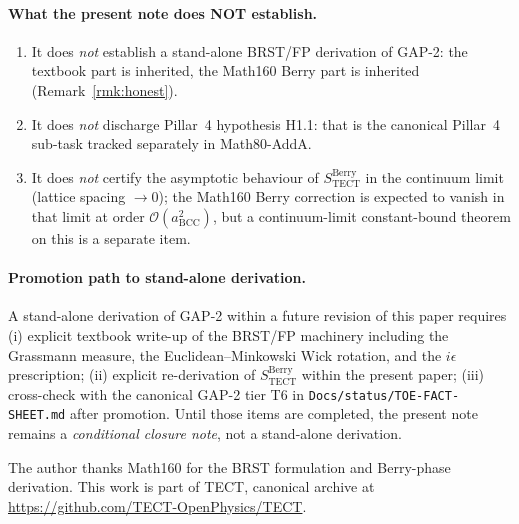 \paragraph{What the present note does NOT establish.}
\begin{enumerate}
  \item It does \emph{not} establish a stand-alone BRST/FP derivation
    of GAP-2: the textbook part is inherited, the Math160 Berry part
    is inherited (Remark~\ref{rmk:honest}).
  \item It does \emph{not} discharge Pillar~4 hypothesis H1.1: that
    is the canonical Pillar~4 sub-task tracked separately in
    Math80-AddA.
  \item It does \emph{not} certify the asymptotic behaviour of
    $S^{\mathrm{Berry}}_{\mathrm{TECT}}$ in the continuum limit
    (lattice spacing $\to 0$); the Math160 Berry correction is
    expected to vanish in that limit at order
    $\mathcal{O}(a_{\mathrm{BCC}}^2)$, but a continuum-limit
    constant-bound theorem on this is a separate item.
\end{enumerate}

\paragraph{Promotion path to stand-alone derivation.}
A stand-alone derivation of GAP-2 within a future revision of this
paper requires (i) explicit textbook write-up of the BRST/FP machinery
including the Grassmann measure, the Euclidean--Minkowski Wick
rotation, and the $i\epsilon$ prescription; (ii) explicit
re-derivation of $S^{\mathrm{Berry}}_{\mathrm{TECT}}$ within the
present paper; (iii) cross-check with the canonical GAP-2 tier T6 in
\texttt{Docs/status/TOE-FACT-SHEET.md} after promotion. Until those
items are completed, the present note remains a \emph{conditional
closure note}, not a stand-alone derivation.

\begin{acknowledgments}
The author thanks Math160 for the BRST formulation and Berry-phase
derivation. This work is part of TECT, canonical archive at
\url{https://github.com/TECT-OpenPhysics/TECT}.
\end{acknowledgments}





